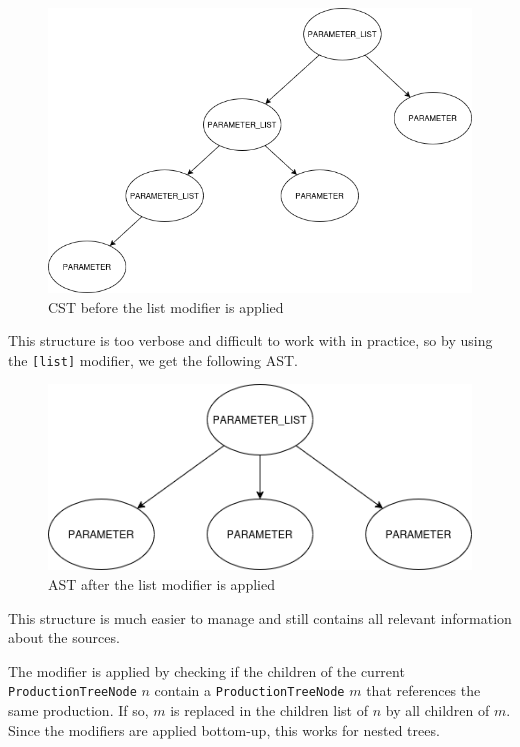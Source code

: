 \begin{figure}[H]
    \centering
    \includegraphics[scale=0.4]{"fig/list_modifier_cst.png"}
    \caption{CST before the list modifier is applied}
\end{figure}

This structure is too verbose and difficult to work with in practice, so by using the \verb|[list]| modifier, we get the following AST.

\begin{figure}[H]
    \centering
    \includegraphics[scale=0.4]{"fig/list_modifier_ast.png"}
    \caption{AST after the list modifier is applied}
\end{figure}

This structure is much easier to manage and still contains all relevant information about the sources.

The modifier is applied by checking if the children of the current \verb|ProductionTreeNode| $n$ contain a \verb|ProductionTreeNode| $m$ that references the same production. If so, $m$ is replaced in the children list of $n$ by all children of $m$.
Since the modifiers are applied bottom-up, this works for nested trees.

